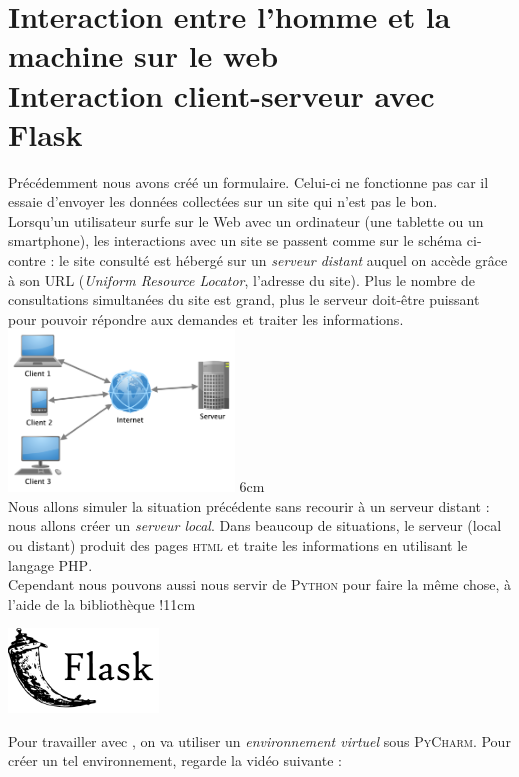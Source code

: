 \documentclass[a4paper,11pt]{book}
\begin{document}
\chapter*{\large Interaction entre l'homme et la machine sur le web \\[-1em]\fontsize{35pt}{42pt}\selectfont Interaction client-serveur avec Flask}

\double
{
	Précédemment nous avons créé un formulaire. Celui-ci ne fonctionne pas car il essaie d'envoyer les données collectées sur un site qui n'est pas 
	le bon.\\
	Lorsqu'un utilisateur surfe sur le Web avec un ordinateur (une tablette ou un smartphone), les interactions avec un site se passent comme sur le 
	schéma ci-contre : le site consulté est hébergé sur un \textit{serveur distant} auquel on accède grâce à son \textsc{URL} (\textit{Uniform 
	Resource Locator}, l'adresse du site). Plus le nombre de consultations simultanées du site est grand, plus le serveur doit-être puissant pour 
	pouvoir répondre aux demandes et traiter les informations.
}
{
	\includegraphics[width=6cm]{img/schema_web.png}
}{6cm}\\[1em]

{
Nous allons simuler la situation précédente sans recourir à un serveur distant : nous allons créer un \textit{serveur local}. Dans beaucoup de 
situations, le serveur (local ou distant) produit des pages \textsc{html} et traite les informations en utilisant le langage \textsc{PHP}.\\
Cependant nous pouvons aussi nous servir de \textsc{Python} pour faire la même chose, à l'aide de la bibliothèque  !}{11cm}
\begin{center}
\includegraphics[width=4cm]{img/Flask.png}
\end{center}
Pour travailler avec , on va utiliser un \textit{environnement virtuel} sous \textsc{PyCharm}. Pour créer un tel environnement, regarde la vidéo suivante :\\
\end{document}
